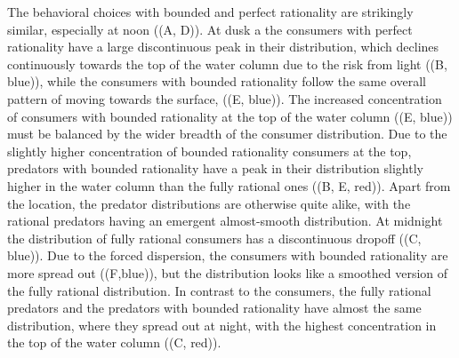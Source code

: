The behavioral choices with bounded and perfect rationality are strikingly similar, especially at noon ((A, D)). At dusk a the consumers with perfect rationality have a large discontinuous peak in their distribution, which declines continuously towards the top of the water column due to the risk from light ((B, blue)), while the consumers with bounded rationality follow the same overall pattern of moving towards the surface, ((E, blue)). The increased concentration of consumers with bounded rationality at the top of the water column ((E, blue)) must be balanced by the wider breadth of the consumer distribution. Due to the slightly higher concentration of bounded rationality consumers at the top, predators with bounded rationality have a peak in their distribution slightly higher in the water column than the fully rational ones ((B, E, red)). Apart from the location, the predator distributions are otherwise quite alike, with the rational predators having an emergent almost-smooth distribution.
At midnight the distribution of fully rational consumers has a discontinuous dropoff ((C, blue)). Due to the forced dispersion, the consumers with bounded rationality are more spread out ((F,blue)), but the distribution looks like a smoothed version of the fully rational distribution.
In contrast to the consumers, the fully rational predators and the predators with bounded rationality have almost the same distribution, where they spread out at night, with the highest concentration in the top of the water column ((C, red)).


